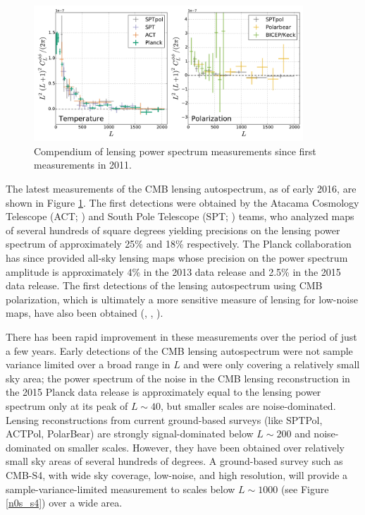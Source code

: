 \begin{figure}[htbp]
\centering
\includegraphics[width=0.9\textwidth]{CMBLensing/autoCompilationTP}
\caption{Compendium of lensing power spectrum measurements since first measurements in 2011.} 
\label{CMBLensPower}
\end{figure}

The latest measurements of the CMB lensing autospectrum, as of early 2016, are shown in Figure \ref{CMBLensPower}. The first detections were obtained by the Atacama Cosmology Telescope (ACT; \cite{Das:2011ak}) and South Pole Telescope  (SPT; \cite{vanEngelen:2012va}) teams, who analyzed maps of several hundreds of square degrees yielding precisions on the lensing power spectrum of approximately 25\% and 18\% respectively.  The Planck collaboration has since provided all-sky lensing maps whose precision on the power spectrum amplitude is approximately 4\% in the 2013 data release and 2.5\% in the 2015 data release.  The first detections of the lensing autospectrum using CMB polarization, which is ultimately a more sensitive measure of lensing for low-noise maps,  have also been obtained (\cite{Ade:2013gez}, \cite{Story:2014hni}, \cite{Array:2016afx}).

There has been rapid improvement in these measurements over the period of just a few years. 
Early detections of the CMB lensing autospectrum were not sample variance limited over a broad range in $L$ and were only covering a relatively small sky area;  
the  power spectrum of the noise in the CMB lensing reconstruction in the 2015 Planck data release is approximately equal to the lensing power spectrum only at its peak of $L \sim 40$, but smaller scales are noise-dominated. Lensing reconstructions from current ground-based surveys (like SPTPol, ACTPol, PolarBear) 
are strongly signal-dominated below $L \sim 200$ and noise-dominated on smaller scales.  However, they have been obtained over relatively small sky areas of several hundreds of degrees. A ground-based survey such as CMB-S4, with wide sky coverage, low-noise, and high resolution, will provide a sample-variance-limited measurement to scales below $L \sim 1000$ (see Figure \ref{n0s_s4}) over a wide area.   
 

